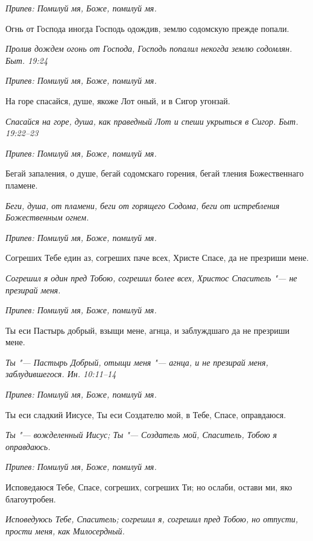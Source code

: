\itshape Припев:\normalfont{} Помилуй мя, Боже, помилуй мя.


Огнь от Господа иногда Господь одождив, землю содомскую прежде попали.


\itshape Пролив дождем огонь от Господа, Господь попалил некогда землю содомлян. Быт. 19:24\normalfont{}


\itshape Припев:\normalfont{} Помилуй мя, Боже, помилуй мя.


На горе спасайся, душе, якоже Лот оный, и в Сигор угонзай.


\itshape Спасайся на горе, душа, как праведный Лот и спеши укрыться в Сигор. Быт. 19:22–23\normalfont{}


\itshape Припев:\normalfont{} Помилуй мя, Боже, помилуй мя.


Бегай запаления, о душе, бегай содомскаго горения, бегай тления Божественнаго пламене.


\itshape Беги, душа, от пламени, беги от горящего Содома, беги от истребления Божественным огнем.\normalfont{}


\itshape Припев:\normalfont{} Помилуй мя, Боже, помилуй мя.


Согреших Тебе един аз, согреших паче всех, Христе Спасе, да не презриши мене.


\itshape Согрешил я один пред Тобою, согрешил более всех, Христос Спаситель "--- не презирай меня.\normalfont{}


\itshape Припев:\normalfont{} Помилуй мя, Боже, помилуй мя.


Ты еси Пастырь добрый, взыщи мене, агнца, и заблуждшаго да не презриши мене.


\itshape Ты "--- Пастырь Добрый, отыщи меня "--- агнца, и не презирай меня, заблудившегося. Ин. 10:11–14\normalfont{}


\itshape Припев:\normalfont{} Помилуй мя, Боже, помилуй мя.


Ты еси сладкий Иисусе, Ты еси Создателю мой, в Тебе, Спасе, оправдаюся.


\itshape Ты "--- вожделенный Иисус; Ты "--- Создатель мой, Спаситель, Тобою я оправдаюсь.\normalfont{}


\itshape Припев:\normalfont{} Помилуй мя, Боже, помилуй мя.


Исповедаюся Тебе, Спасе, согреших, согреших Ти; но ослаби, остави ми, яко благоутробен.


\itshape Исповедуюсь Тебе, Спаситель; согрешил я, согрешил пред Тобою, но отпусти, прости меня, как Милосердный.\normalfont{}


